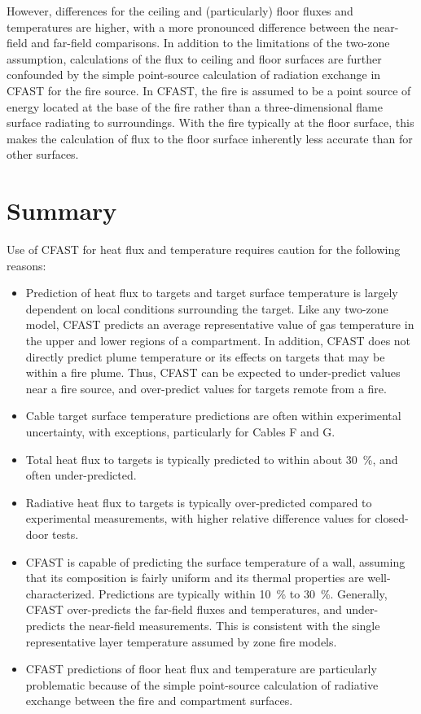 However, differences for the ceiling and (particularly) floor fluxes and temperatures are higher, with a more pronounced difference between the near-field and far-field comparisons.  In addition to the limitations of the two-zone assumption, calculations of the flux to ceiling and floor surfaces are further confounded by the simple point-source calculation of radiation exchange in CFAST for the fire source.  In CFAST, the fire is assumed to be a point source of energy located at the base of the fire rather than a three-dimensional flame surface radiating to surroundings.  With the fire typically at the floor surface, this makes the calculation of flux to the floor surface inherently less accurate than for other surfaces.

\section{Summary}

Use of CFAST for heat flux and temperature requires caution for the following reasons:

\begin{itemize}
\item  Prediction of heat flux to targets and target surface temperature is largely dependent on local conditions surrounding the target.  Like any two-zone model, CFAST predicts an average representative value of gas temperature in the upper and lower regions of a compartment.  In addition, CFAST does not directly predict plume temperature or its effects on targets that may be within a fire plume.  Thus, CFAST can be expected to under-predict values near a fire source, and over-predict values for targets remote from a fire.
\item Cable target surface temperature predictions are often within experimental uncertainty, with exceptions, particularly for Cables F and G.
\item Total heat flux to targets is typically predicted to within about 30~\%, and often under-predicted.
\item Radiative heat flux to targets is typically over-predicted compared to experimental measurements, with higher relative difference values for closed-door tests.
\item CFAST is capable of predicting the surface temperature of a wall, assuming that its composition is fairly uniform and its thermal properties are well-characterized.  Predictions are typically within 10~\% to 30~\%.  Generally, CFAST over-predicts the far-field fluxes and temperatures, and under-predicts the near-field measurements.  This is consistent with the single representative layer temperature assumed by zone fire models.
\item CFAST predictions of floor heat flux and temperature are particularly problematic because of the simple point-source calculation of radiative exchange between the fire and compartment surfaces.
\end{itemize}

